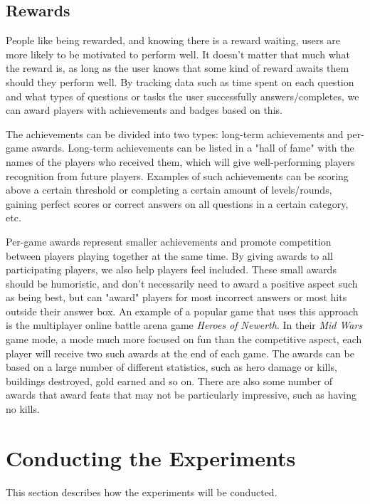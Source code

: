 
\subsection{Rewards}

People like being rewarded, and knowing there is a reward waiting, users are more likely to be motivated to perform well. It doesn't matter that much what the reward is, as long as the user knows that some kind of reward awaits them should they perform well. By tracking data such as time spent on each question and what types of questions or tasks the user successfully answers/completes, we can award players with achievements and badges based on this.

The achievements can be divided into two types: long-term achievements and per-game awards. Long-term achievements can be listed in a "hall of fame" with the names of the players who received them, which will give well-performing players recognition from future players. Examples of such achievements can be scoring above a certain threshold or completing a certain amount of levels/rounds, gaining perfect scores or correct answers on all questions in a certain category, etc.

Per-game awards represent smaller achievements and promote competition between players playing together at the same time. By giving awards to all participating players, we also help players feel included. These small awards should be humoristic, and don't necessarily need to award a positive aspect such as being best, but can "award" players for most incorrect answers or most hits outside their answer box. An example of a popular game that uses this approach is the multiplayer online battle arena game \emph{Heroes of Newerth}\citep{Newerth}. In their \emph{Mid Wars} game mode, a mode much more focused on fun than the competitive aspect, each player will receive two such awards at the end of each game. The awards can be based on a large number of different statistics, such as hero damage or kills, buildings destroyed, gold earned and so on\citep{MidWars}. There are also some number of awards that award feats that may not be particularly impressive, such as having no kills.


\section{Conducting the Experiments}

This section describes how the experiments will be conducted.